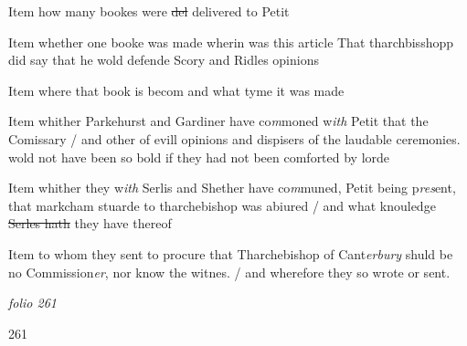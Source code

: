 \documentclass[12pt, a4paper]{book}
\begin{document}
		\ifthenelse{\isodd{\thepage}}
		{\reversemarginpar}
		{\normalmarginpar}
		Item how many bookes were \sout{del }delivered to Petit
 	
				\marginpar[\vspace{0.5cm}{\textcolor{Gray}{22}}]{}
			
		\ifthenelse{\isodd{\thepage}}
		{\reversemarginpar}
		{\normalmarginpar}
		Item whether one booke was made wherin was this article
That tharchbisshopp did say that he wold defende
Scory and Ridles opinions
 	
				\marginpar[\vspace{0.5cm}{\textcolor{Gray}{23}}]{}
			
		\ifthenelse{\isodd{\thepage}}
		{\reversemarginpar}
		{\normalmarginpar}
		Item where that book is becom and what tyme it was made
 	
				\marginpar[\vspace{0.5cm}{\textcolor{Gray}{24}}]{}
			
		\ifthenelse{\isodd{\thepage}}
		{\reversemarginpar}
		{\normalmarginpar}
		Item whither Parkehurst and Gardiner have co\textit{m}moned w\textit{ith}
Petit that the Comissary / and other of evill opinions
and dispisers of the laudable ceremonies. wold not have been
so bold if they had not been comforted by lorde
 	
				\marginpar[\vspace{0.5cm}{\textcolor{Gray}{25}}]{}
			
		\ifthenelse{\isodd{\thepage}}
		{\reversemarginpar}
		{\normalmarginpar}
		Item whither they w\textit{ith} Serlis and Shether have co\textit{m}muned, Petit 
being p\textit{res}ent, that markcham stuarde to tharchebishop was 
abiured / and what knouledge \sout{Serles hath}
               they have
			 thereof

				\marginpar[\vspace{0.5cm}{\textcolor{Gray}{26}}]{}
			
		\ifthenelse{\isodd{\thepage}}
		{\reversemarginpar}
		{\normalmarginpar}
		Item to whom they sent to procure that Tharchebishop of Cant\textit{erbury}
shuld be no Commission\textit{er}, nor know the witnes. / and
wherefore they so wrote or sent.

\dotfill
						\newpage
{}

\textit{folio 261}


 	\begin{flushright}{\color{Mahogany}261}\end{flushright}
\end{document}
